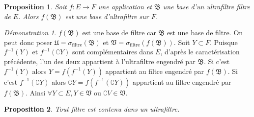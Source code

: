 \documentclass[a4paper, 11pt, french]{book}
\theoremstyle{plain} %
\newtheorem{proposition}{Proposition}
\theoremstyle{definition} %
\theoremstyle{remark} %
\newtheorem*{demonstration}{Démonstration}
\newcommand{\1}{\mathds{1}}
\newcommand{\inv}[1]{#1^{-1}}
\newcommand\ou{\text{ ou }}
\renewcommand{\frak}[1]{\mathfrak{#1}}
\begin{document}
\begin{proposition}
	Soit $f:E\rightarrow F$ une application et $\frak{B}$ une base d'un ultrafiltre filtre de $E$.
	Alors $f(\frak{B})$ est une base d'ultrafiltre sur $F$.
\end{proposition}

\begin{demonstration}
	$f(\frak{B})$ est une base de filtre car $\frak{B}$ est une base de filtre.
	On peut donc poser $\frak{U}=\sigma_\text{filtre}(\frak{B})$ et $\frak{V}=\sigma_\text{filtre}(f(\frak{B}))$.
	Soit $Y\subset F$.
	Puisque $\inv{f}(Y)$ et $\inv{f}(\complement Y)$ sont complémentaires dans $E$, d'après le caractérisation précédente, l'un des deux appartient à l'ultrafiltre engendré par $\frak{B}$.
	Si c'est $\inv{f}(Y)$ alors $Y=f(\inv{f}(Y))$ appartient au filtre engendré par $f(\frak{B})$.
	Si c'est $\inv{f}(\complement Y)$ alors $\complement Y=f(\inv{f}(\complement Y))$ appartient au filtre engendré par $f(\frak{B})$.
	Ainsi $\forall Y\subset E, Y\in\frak{V}\ou\complement V\in\frak{V}$.
\end{demonstration}

\begin{proposition}
	Tout filtre est contenu dans un ultrafiltre.
\end{proposition}
\end{document}
